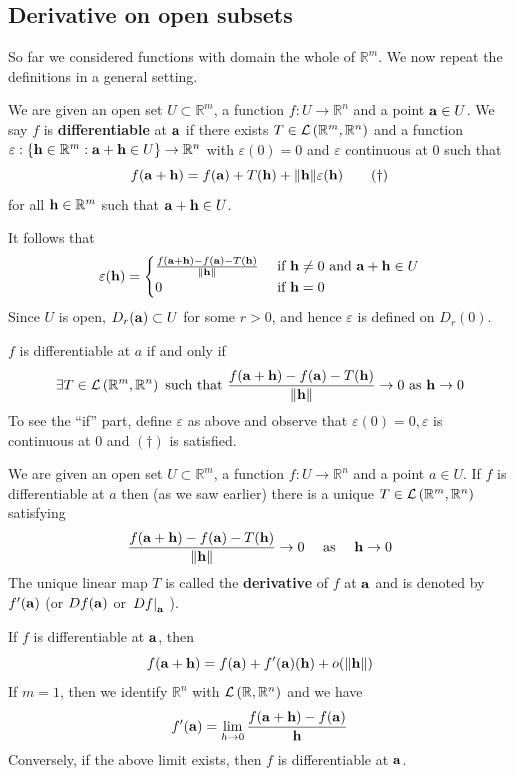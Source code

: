 \documentclass[a4paper,11pt]{article}
\begin{document}
\subsection{Derivative on open subsets}
So far we considered functions with domain the whole of $\mathbb{R}^{m}$. We now repeat the definitions in a general setting.

\begin{definition}
    We are given an open set $U \subset \mathbb{R}^{m}$, a function $f: U \rightarrow \mathbb{R}^{n}$ and a point ${\bf a} \in U$. We say $f$ is \textbf{differentiable} at ${\bf a}$ if there exists $T \in {\mathcal{L}}\left(\mathbb{R}^{m}, \mathbb{R}^{n}\right)$ and a function $\varepsilon:\left\{{\bf h} \in \mathbb{R}^{m}: {\bf a}+{\bf h} \in U\right\} \rightarrow \mathbb{R}^{n}$ with $\varepsilon(0)=0$ and $\varepsilon$ continuous at 0 such that
\[
f({\bf a}+{\bf h})=f({\bf a})+T({\bf h})+\|{\bf h}\| \varepsilon({\bf h}) \tag{$\dagger$}
\]
for all ${\bf h} \in \mathbb{R}^{m}$ such that ${\bf a}+{\bf h} \in U$.
\end{definition}
It follows that
$$
\varepsilon({\bf h})= \begin{cases}\frac{f({\bf a}+{\bf h})-f({\bf a})-T({\bf h})}{\|{\bf h}\|} & \text { if } {\bf h} \neq 0 \text { and } {\bf a}+{\bf h} \in U \\ 0 & \text { if } {\bf h}=0\end{cases}
$$
Since $U$ is open, $D_{r}({\bf a}) \subset U$ for some $r>0$, and hence $\varepsilon$ is defined on $D_{r}(0)$.
\begin{note}
    $f$ is differentiable at $a$ if and only if
$$
\exists T \in {\mathcal{L}}\left(\mathbb{R}^{m}, \mathbb{R}^{n}\right) \text { such that } \frac{f({\bf a}+{\bf h})-f({\bf a})-T({\bf h})}{\|{\bf h}\|} \rightarrow 0 \text { as } {\bf h} \rightarrow 0
$$
To see the ``if'' part, define $\varepsilon$ as above and observe that $\varepsilon(0)=0, \varepsilon$ is continuous at 0 and $(\dagger)$ is satisfied.
\end{note}

\begin{definition}
    We are given an open set $U \subset \mathbb{R}^{m}$, a function $f: U \rightarrow \mathbb{R}^{n}$ and a point $a \in U$. If $f$ is differentiable at $a$ then (as we saw earlier) there is a unique $T \in {\mathcal{L}}\left(\mathbb{R}^{m}, \mathbb{R}^{n}\right)$ satisfying
$$
\frac{f({\bf a}+{\bf h})-f({\bf a})-T({\bf h})}{\|{\bf h}\|} \rightarrow 0 \quad \text { as } \quad {\bf h} \rightarrow 0
$$
The unique linear map $T$ is called the \textbf{derivative} of $f$ at ${\bf a}$ and is denoted by $f^{\prime}({\bf a})$ (or $D f({\bf a})$ or $\left.D f\right|_{{\bf a}}$ ).
\end{definition}
\begin{note}
    If $f$ is differentiable at ${\bf a}$, then
$$
f({\bf a}+{\bf h})=f({\bf a})+f^{\prime}({\bf a})({\bf h})+o(\|{\bf h}\|)
$$
If $m=1$, then we identify $\mathbb{R}^{n}$ with ${\mathcal{L}}\left(\mathbb{R}, \mathbb{R}^{n}\right)$ and we have
$$
f^{\prime}({\bf a})=\lim _{h \rightarrow 0} \frac{f({\bf a}+{\bf h})-f({\bf a})}{{\bf h}}
$$
Conversely, if the above limit exists, then $f$ is differentiable at ${\bf a}$.
\end{note}
\end{document}

